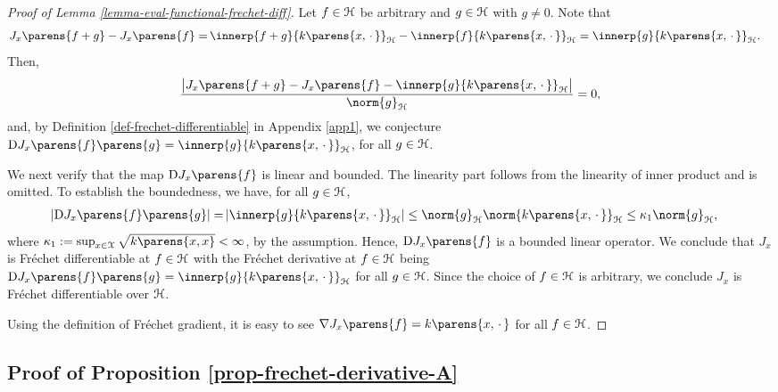\begin{proof}[Proof of Lemma \ref{lemma-eval-functional-frechet-diff}]
	Let $f \in \mathcal{H}$ be arbitrary and $g \in \mathcal{H}$ with $g \neq 0$. Note that 
	\begin{align*}
		J_x \parens{f + g} - J_x \parens{f} = & \, \innerp{f + g}{k \parens{x, \,\cdot\,}}_{\calH} - \innerp{f}{k \parens{x, \,\cdot\,}}_{\calH} 
		= \innerp{g}{k \parens{x, \,\cdot\,}}_{\calH}. 
	\end{align*}
	Then, 
	\begin{align*}
		\frac{\abs[\big]{J_x \parens{f + g} - J_x \parens{f} - \innerp{g}{k \parens{x, \,\cdot\,}}_{\calH}}}{\norm{g}_{\calH}} = 0, 
	\end{align*}
	and, by Definition \ref{def-frechet-differentiable} in Appendix \ref{app1}, we conjecture $\Diff J_x \parens{f} \parens{g} = \innerp{g}{k \parens{x, \,\cdot\,}}_{\calH}$, for all $g \in \mathcal{H}$. 
	
	We next verify that the map $\Diff J_x \parens{f}$ is linear and bounded. The linearity part follows from the linearity of inner product and is omitted. To establish the boundedness, we have, for all $g \in \mathcal{H}$, 
	\begin{align*}
		\abs{\Diff J_x \parens{f} \parens{g}} = & \, \abs{\innerp{g}{k \parens{x, \,\cdot\,}}_{\calH}} 
		\le \norm{g}_{\calH} \norm{k \parens{x, \,\cdot\,}}_{\calH} 
		\le \kappa_1 \norm{g}_{\calH}, 
	\end{align*}
	where $\kappa_1 := \sup_{x \in \calX} \sqrt{k \parens{x, x}} < \infty$, by the assumption. Hence, $\Diff J_x \parens{f}$ is a bounded linear operator. We conclude that $J_x$ is Fr{\'e}chet differentiable at $f \in \mathcal{H}$ with the Fr{\'e}chet derivative at $f \in \mathcal{H}$ being $\Diff J_x \parens{f} \parens{g} = \innerp{g}{k \parens{x, \,\cdot\,}}_{\calH}$ for all $g \in \mathcal{H}$. Since the choice of $f \in \mathcal{H}$ is arbitrary, we conclude $J_x$ is Fr{\'e}chet differentiable over $\mathcal{H}$. %
	
	Using the definition of Fr{\'e}chet gradient, it is easy to see $\nabla J_x \parens{f} = k \parens{x, \,\cdot\,}$ for all $f \in \mathcal{H}$. 
\end{proof}


\subsection{Proof of Proposition \ref{prop-frechet-derivative-A}}\label{subsection-proof-prop-frechet-derivative-A}

